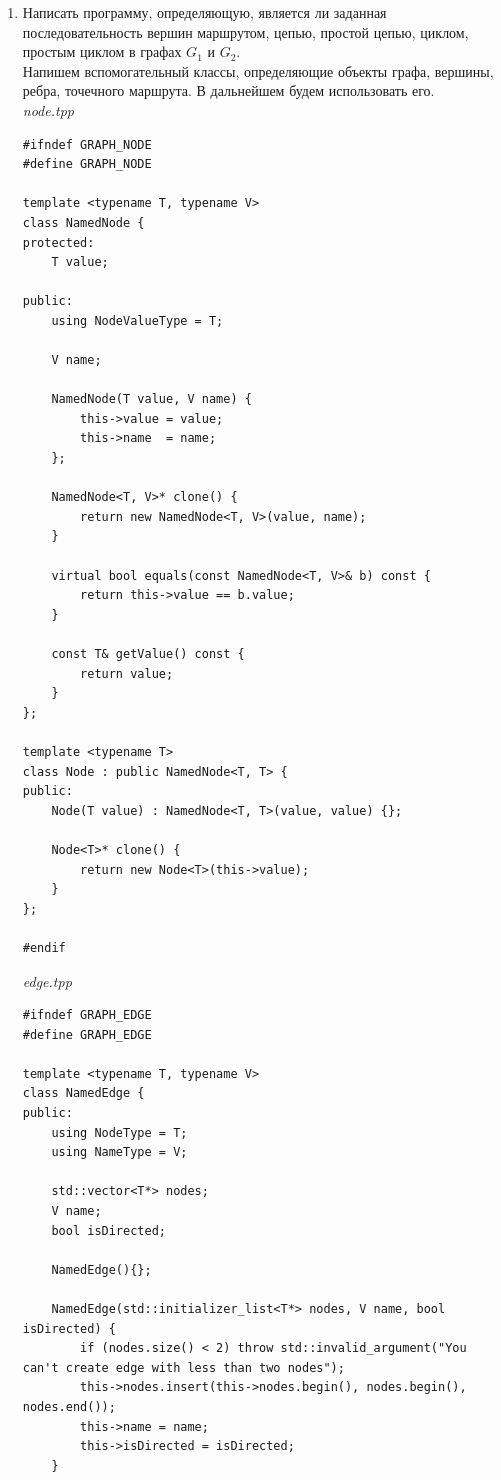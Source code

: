 \documentclass[a4paper,14pt]{extarticle}
\begin{document}
\begin{enumerate}[1.]
        \item Написать программу, определяющую, является ли заданная последовательность
        вершин маршрутом, цепью, простой цепью, циклом, простым циклом в графах $G_1$ и $G_2$.\\
        Напишем вспомогательный классы, определяющие объекты графа, вершины, ребра, точечного маршрута. В дальнейшем будем использовать его.\\
        \textit{node.tpp}
        \begin{verbatim}
#ifndef GRAPH_NODE
#define GRAPH_NODE

template <typename T, typename V>
class NamedNode {
protected:    
    T value;

public:
    using NodeValueType = T;

    V name;

    NamedNode(T value, V name) {
        this->value = value;
        this->name  = name;
    };

    NamedNode<T, V>* clone() {
        return new NamedNode<T, V>(value, name);
    }

    virtual bool equals(const NamedNode<T, V>& b) const {
        return this->value == b.value;
    }

    const T& getValue() const {
        return value;
    }
};

template <typename T>
class Node : public NamedNode<T, T> {
public:
    Node(T value) : NamedNode<T, T>(value, value) {};

    Node<T>* clone() {
        return new Node<T>(this->value);
    }
};

#endif
        \end{verbatim} 
        
        \textit{edge.tpp}
        \begin{verbatim}
#ifndef GRAPH_EDGE
#define GRAPH_EDGE

template <typename T, typename V>
class NamedEdge {
public:
    using NodeType = T;
    using NameType = V;

    std::vector<T*> nodes;
    V name;
    bool isDirected;

    NamedEdge(){};

    NamedEdge(std::initializer_list<T*> nodes, V name, bool isDirected) {
        if (nodes.size() < 2) throw std::invalid_argument("You can't create edge with less than two nodes");
        this->nodes.insert(this->nodes.begin(), nodes.begin(), nodes.end());
        this->name = name;
        this->isDirected = isDirected;
    }


\end{verbatim}
\end{enumerate}
\end{document}
